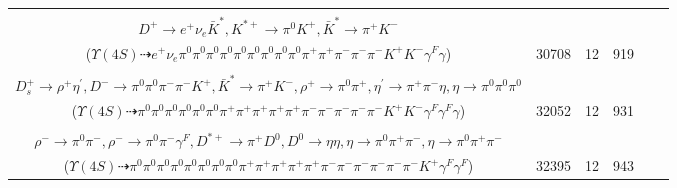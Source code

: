 \documentclass[landscape]{article}
\newcounter{rownumbers}
\newcommand\rn{\stepcounter{rownumbers}\arabic{rownumbers}}
\newcommand{\EOLP}{\\ \hline} %
\newcommand{\topoTags}[1]{#1} %
\begin{document}
\begin{longtable}{clcccc}
\rn & \makecell[l]{ $ 
\Upsilon(4S) \rightarrow B^{0} \bar{B}^{0} ,
B^{0} \rightarrow \pi^{-} K_1^{+} \gamma^{F} ,
\bar{B}^{0} \rightarrow \pi^{0} \pi^{0} \pi^{0} \pi^{+} \pi^{-} \pi^{-} \eta \omega D^{+} ,
K_1^{+} \rightarrow \pi^{0} K^{*+} ,
\eta \rightarrow \pi^{0} \pi^{0} \pi^{0} ,
\omega \rightarrow \pi^{0} \gamma ,
$ \\ $
D^{+} \rightarrow e^{+} \nu_{e} \bar{K}^{*} ,
K^{*+} \rightarrow \pi^{0} K^{+} ,
\bar{K}^{*} \rightarrow \pi^{+} K^{-} 
$ \\ ($
\Upsilon(4S) \dashrightarrow e^{+} \nu_{e} \pi^{0} \pi^{0} \pi^{0} \pi^{0} \pi^{0} \pi^{0} \pi^{0} \pi^{0} \pi^{0} \pi^{+} \pi^{+} \pi^{-} \pi^{-} \pi^{-} K^{+} K^{-} \gamma^{F} \gamma 
$) } & \topoTags{30708 & }12 & 919 \EOLP

\rn & \makecell[l]{ $ 
\Upsilon(4S) \rightarrow B^{0} \bar{B}^{0} ,
B^{0} \rightarrow D_{s}^{*+} D_{1}^{-} ,
\bar{B}^{0} \rightarrow \pi^{+} K^{*}(1410)^{-} \gamma^{F} ,
D_{s}^{*+} \rightarrow D_{s}^{+} \gamma ,
D_{1}^{-} \rightarrow \pi^{+} \pi^{-} D^{-} \gamma^{F} ,
K^{*}(1410)^{-} \rightarrow \pi^{-} \bar{K}^{*} ,
$ \\ $
D_{s}^{+} \rightarrow \rho^{+} \eta^{\prime} ,
D^{-} \rightarrow \pi^{0} \pi^{0} \pi^{-} \pi^{-} K^{+} ,
\bar{K}^{*} \rightarrow \pi^{+} K^{-} ,
\rho^{+} \rightarrow \pi^{0} \pi^{+} ,
\eta^{\prime} \rightarrow \pi^{+} \pi^{-} \eta ,
\eta \rightarrow \pi^{0} \pi^{0} \pi^{0} 
$ \\ ($
\Upsilon(4S) \dashrightarrow \pi^{0} \pi^{0} \pi^{0} \pi^{0} \pi^{0} \pi^{0} \pi^{+} \pi^{+} \pi^{+} \pi^{+} \pi^{+} \pi^{-} \pi^{-} \pi^{-} \pi^{-} \pi^{-} K^{+} K^{-} \gamma^{F} \gamma^{F} \gamma 
$) } & \topoTags{32052 & }12 & 931 \EOLP

\rn & \makecell[l]{ $ 
\Upsilon(4S) \rightarrow B^{0} \bar{B}^{0} ,
B^{0} \rightarrow \pi^{-} \eta K^{+} ,
\bar{B}^{0} \rightarrow \rho^{0} \rho^{+} \rho^{-} \rho^{-} D^{*+} ,
\eta \rightarrow \pi^{0} \pi^{0} \pi^{0} ,
\rho^{0} \rightarrow \pi^{+} \pi^{-} ,
\rho^{+} \rightarrow \pi^{0} \pi^{+} \gamma^{F} ,
$ \\ $
\rho^{-} \rightarrow \pi^{0} \pi^{-} ,
\rho^{-} \rightarrow \pi^{0} \pi^{-} \gamma^{F} ,
D^{*+} \rightarrow \pi^{+} D^{0} ,
D^{0} \rightarrow \eta \eta ,
\eta \rightarrow \pi^{0} \pi^{+} \pi^{-} ,
\eta \rightarrow \pi^{0} \pi^{+} \pi^{-} 
$ \\ ($
\Upsilon(4S) \dashrightarrow \pi^{0} \pi^{0} \pi^{0} \pi^{0} \pi^{0} \pi^{0} \pi^{0} \pi^{0} \pi^{+} \pi^{+} \pi^{+} \pi^{+} \pi^{+} \pi^{-} \pi^{-} \pi^{-} \pi^{-} \pi^{-} \pi^{-} K^{+} \gamma^{F} \gamma^{F} 
$) } & \topoTags{32395 & }12 & 943 \EOLP


\end{longtable}
\end{document}
